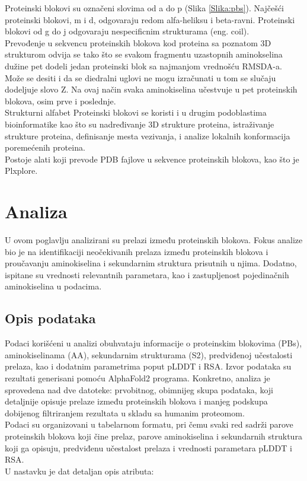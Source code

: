\documentclass[a4paper,12pt]{article}
\begin{document}
\newpage
Proteinski blokovi su označeni slovima od a do p (Slika \ref{Slika:pbs}). Najčešći proteinski blokovi, m i d, odgovaraju redom alfa-heliksu i beta-ravni. Proteinski blokovi od g do j odgovaraju nespecificnim strukturama (eng. coil). \\
Prevođenje u sekvencu proteinskih blokova kod proteina sa poznatom 3D strukturom odvija se tako što se svakom fragmentu uzastopnih aminokselina dužine pet dodeli jedan proteinski blok sa najmanjom vrednošću RMSDA-a. Može se desiti i da se diedralni uglovi ne mogu izračunati u tom se slučaju dodeljuje slovo Z. Na ovaj način svaka aminokiselina učestvuje u pet proteinskih blokova, osim prve i poslednje. \\
Strukturni alfabet Proteinski blokovi se koristi i u drugim podoblastima bioinformatike kao što su nadređivanje 3D strukture proteina, istraživanje strukture proteina, definisanje mesta vezivanja, i analize lokalnih konformacija poremećenih proteina. \\
Postoje alati koji prevode PDB fajlove u sekvence proteinskih blokova, kao što je Plxplore.
\newpage
\section{Analiza}
U ovom poglavlju analizirani su prelazi između proteinskih blokova. Fokus analize bio je na identifikaciji neočekivanih prelaza između proteinskih blokova i proučavanju aminokiselina i sekundarnim struktura prisutnih u njima. Dodatno, ispitane su vrednosti relevantnih parametara, kao i zastupljenost pojedinačnih aminokiselina u podacima.

\subsection{Opis podataka}
Podaci korišćeni u analizi obuhvataju informacije o proteinskim blokovima (PBs), aminokiselinama (AA), sekundarnim strukturama (S2), predviđenoj učestalosti prelaza, kao i dodatnim parametrima poput pLDDT i RSA. Izvor podataka su rezultati generisani pomoću AlphaFold2 programa. Konkretno, analiza je sprovedena nad dve datoteke: prvobitnog, obimnijeg skupa podataka, koji detaljnije opisuje prelaze između proteinskih blokova i manjeg podskupa dobijenog filtriranjem rezultata u skladu sa humanim proteomom. \\
Podaci su organizovani u tabelarnom formatu, pri čemu svaki red sadrži parove proteinskih blokova koji čine prelaz, parove aminokiselina i sekundarnih struktura koji ga opisuju, predviđenu učestalost prelaza i vrednosti parametara pLDDT i RSA.
\\
U nastavku je dat detaljan opis atributa:
\end{document}
